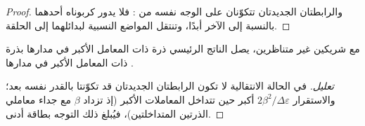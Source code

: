\begin{proof}
 والرابطتان الجديدتان تتكوّنان على الوجه نفسه من
: فلا يدور كربوناه أحدهما بالنسبة إلى الآخر أبدًا، وتنتقل المواضع
النسبية لبدائلهما إلى الحلقة.
\end{proof}

\begin{proposition}\label{prop:b2:frontier-orbitals:da-regio}
مع شريكين غير متناظرين، يصل الناتج الرئيسي ذرة  ذات
المعامل الأكبر في مدارها  بذرة  ذات المعامل
الأكبر في مدارها .
\end{proposition}

\begin{proof}[تعليل]
في الحالة الانتقالية لا تكون الرابطتان الجديدتان قد تكوّنتا بالقدر نفسه بعد؛ 
والاستقرار $2\beta^2/\Delta\varepsilon$ أكبر حين تتداخل المعاملات الأكبر (إذ تزداد $\beta$
مع جداء معاملي الذرتين المتداخلتين)، فيُبلغ ذلك
التوجه بطاقة أدنى.
\end{proof}

